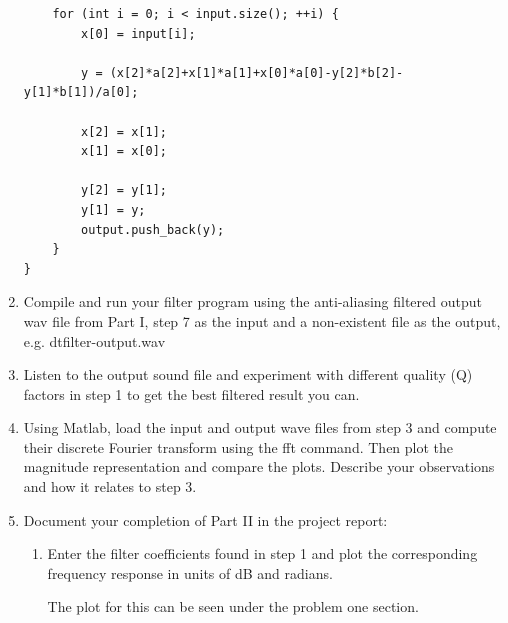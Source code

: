 \documentclass{article}
\begin{document}
\begin{enumerate}
\begin{verbatim}
    for (int i = 0; i < input.size(); ++i) {
        x[0] = input[i];
        
        y = (x[2]*a[2]+x[1]*a[1]+x[0]*a[0]-y[2]*b[2]-y[1]*b[1])/a[0];
    
        x[2] = x[1];
        x[1] = x[0];
    
        y[2] = y[1];
        y[1] = y;
        output.push_back(y);
    }
}
    \end{verbatim} 
    \item Compile and run your filter program using the anti-aliasing filtered output wav file from Part I, step 7 as the input and a non-existent file as the output, e.g. dtfilter-output.wav
    \item Listen to the output sound file and experiment with different quality (Q) factors in step 1 to get the best filtered result you can.
    \item Using Matlab, load the input and output wave files from step 3 and compute their discrete Fourier transform using the fft command. Then plot the magnitude representation and compare the plots. Describe your observations and how it relates to step 3.
    
    \begin{center}
    \end{center}
    \item Document your completion of Part II in the project report:
    \begin{enumerate}
        \item Enter the filter coefficients found in step 1 and plot the corresponding frequency response in units of dB and radians.
        \begin{center}
            The plot for this can be seen under the problem one section.
        \end{center}

\end{enumerate}
\end{enumerate}
\end{document}
